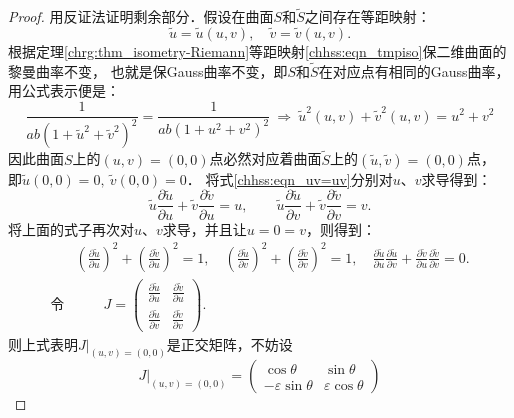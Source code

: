 \begin{proof}
用反证法证明剩余部分．假设在曲面$S$和$\tilde{S}$之间存在等距映射：
\begin{equation}\label{chhss:eqn_tmpiso}
    \tilde{u}=\tilde{u}(u, v), \quad \tilde{v}=\tilde{v}(u, v) .
\end{equation}
根据定理\ref{chrg:thm_isometry-Riemann}等距映射\eqref{chhss:eqn_tmpiso}保二维曲面的黎曼曲率不变，
也就是保Gauss曲率不变，即$S$和$\tilde{S}$在对应点有相同的Gauss曲率，用公式表示便是：
\begin{equation}\label{chhss:eqn_uv=uv}
    \frac{1}{a b\left(1+\tilde{u}^2+\tilde{v}^2\right)^2} = \frac{1}{a b \left(1+u^2+v^2\right)^2} 
    \ \Rightarrow \  \tilde{u}^2(u, v)+\tilde{v}^2(u, v)=u^2+v^2 
\end{equation}  %
因此曲面$S$上的$(u, v)=(0,0)$点必然对应着曲面$\tilde{S}$上的$(\tilde{u}, \tilde{v})=(0,0)$点，
即$\tilde{u}(0,0)=0, \ \tilde{v}(0,0)=0 $．
将式\eqref{chhss:eqn_uv=uv}分别对$u$、$v$求导得到：
\begin{equation}
    \tilde{u} \frac{\partial \tilde{u}}{\partial u}+\tilde{v} \frac{\partial \tilde{v}}{\partial u}=u, 
    \qquad \tilde{u} \frac{\partial \tilde{u}}{\partial v}+\tilde{v} \frac{\partial \tilde{v}}{\partial v}=v.
\end{equation}
将上面的式子再次对$u$、$v$求导，并且让$u=0=v$，则得到：
\begin{align*}
    &\left(\frac{\partial \tilde{u}}{\partial u}\right)^2+\left(\frac{\partial \tilde{v}}{\partial u}\right)^2=1, \quad
    \left(\frac{\partial \tilde{u}}{\partial v}\right)^2+\left(\frac{\partial \tilde{v}}{\partial v}\right)^2=1, \quad
    \frac{\partial \tilde{u}}{\partial u} \frac{\partial \tilde{u}}{\partial v}
    +\frac{\partial \tilde{v}}{\partial u} \frac{\partial \tilde{v}}{\partial v}=0 .  \\
  \text{令}&\qquad J=\begin{pmatrix}
    \frac{\partial \tilde{u}}{\partial u} & \frac{\partial \tilde{v}}{\partial u} \\
    \frac{\partial \tilde{u}}{\partial v} & \frac{\partial \tilde{v}}{\partial v}
\end{pmatrix} .
\end{align*}
则上式表明$J|_{(u, v)=(0,0)}$是正交矩阵，不妨设
\begin{equation}\label{chhss:eqn_tmpJ00}
    \left. J\right|_{(u, v)=(0,0)} = \begin{pmatrix}
        \cos \theta & \sin \theta \\ 
        -\varepsilon \sin \theta & \varepsilon \cos \theta

\end{pmatrix}
\end{equation}
\end{proof}
